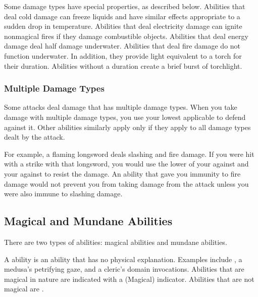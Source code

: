             Some damage types have special properties, as described below.
             Abilities that deal cold damage can freeze liquids and have similar effects appropriate to a sudden drop in temperature.
             Abilities that deal electricity damage can ignite nonmagical fires if they damage combustible objects.
             Abilities that deal energy damage deal half damage underwater.
             Abilities that deal fire damage do not function underwater.
            In addition, they provide light equivalent to a torch for their duration.
            Abilities without a duration create a brief burst of torchlight.

        \subsubsection{Multiple Damage Types}\label{Multiple Damage Types}
            Some attacks deal damage that has multiple damage types.
            When you take damage with multiple damage types, you use your lowest applicable  to defend against it.
            Other abilities similarly apply only if they apply to all damage types dealt by the attack.

            For example, a flaming longsword deals slashing and fire damage.
            If you were hit with a strike with that longsword, you would use the lower of your  against  and your  against  to resist the damage.
            An ability that gave you immunity to fire damage would not prevent you from taking damage from the attack unless you were also immune to slashing damage.

    \subsection{Magical and Mundane Abilities}\label{Magical and Mundane Abilities}

        There are two types of abilities: magical abilities and mundane abilities.

        \label{Magical Abilities} A  ability is an ability that has no physical explanation.
        Examples include , a medusa's petrifying gaze, and a cleric's domain invocations.
        Abilities that are magical in nature are indicated with a (Magical) indicator.
        Abilities that are not magical are .

